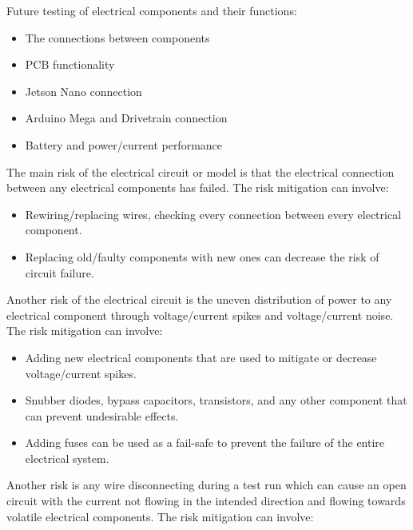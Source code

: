 \documentclass[a4paper, 10pt]{article}
\begin{document}
		Future testing of electrical components and their functions:
		\begin{itemize}
		\item The connections between components

		\item PCB functionality

		\item Jetson Nano connection

		\item Arduino Mega and Drivetrain connection

		\item Battery and power/current performance
		\end{itemize}

		The main risk of the electrical circuit or model is that the electrical connection between any electrical components has failed. The risk mitigation can involve:

		\begin{itemize}
		\item Rewiring/replacing wires, checking every connection between every electrical component.

		\item Replacing old/faulty components with new ones can decrease the risk of circuit failure.
		\end{itemize}

		Another risk of the electrical circuit is the uneven distribution of power to any electrical component through voltage/current spikes and voltage/current noise. The risk mitigation can involve:

		\begin{itemize}
		\item Adding new electrical components that are used to mitigate or decrease voltage/current spikes.
		
		\item Snubber diodes, bypass capacitors, transistors, and any other component that can prevent undesirable effects. 
	
		\item Adding fuses can be used as a fail-safe to prevent the failure of the entire electrical system.
		\end{itemize}


		Another risk is any wire disconnecting during a test run which can cause an open circuit with the current not flowing in the intended direction and flowing towards volatile electrical components. The risk mitigation can involve:
\end{document}
